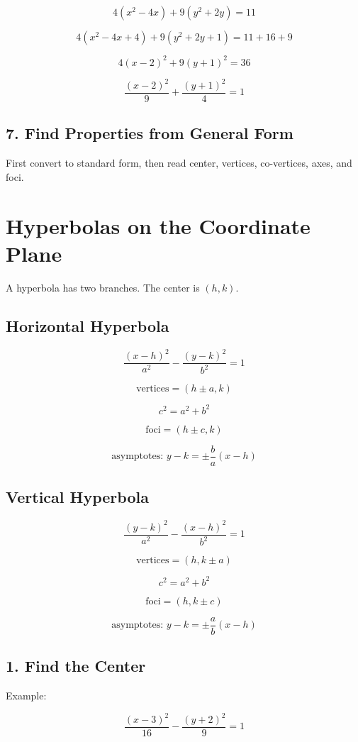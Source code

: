 \documentclass[11pt]{article}
\begin{document}
\[
4(x^2-4x)+9(y^2+2y)=11
\]

\[
4(x^2-4x+4)+9(y^2+2y+1)=11+16+9
\]

\[
4(x-2)^2+9(y+1)^2=36
\]

\[
\frac{(x-2)^2}{9}+\frac{(y+1)^2}{4}=1
\]

\subsection*{7. Find Properties from General Form}

First convert to standard form, then read center, vertices, co-vertices, axes, and foci.

\section*{Hyperbolas on the Coordinate Plane}

A hyperbola has two branches. The center is \((h,k)\).

\subsection*{Horizontal Hyperbola}

\[
\frac{(x-h)^2}{a^2}-\frac{(y-k)^2}{b^2}=1
\]

\[
\text{vertices}=(h\pm a,k)
\]

\[
c^2=a^2+b^2
\]

\[
\text{foci}=(h\pm c,k)
\]

\[
\text{asymptotes: }y-k=\pm\frac{b}{a}(x-h)
\]

\subsection*{Vertical Hyperbola}

\[
\frac{(y-k)^2}{a^2}-\frac{(x-h)^2}{b^2}=1
\]

\[
\text{vertices}=(h,k\pm a)
\]

\[
c^2=a^2+b^2
\]

\[
\text{foci}=(h,k\pm c)
\]

\[
\text{asymptotes: }y-k=\pm\frac{a}{b}(x-h)
\]

\subsection*{1. Find the Center}

Example:

\[
\frac{(x-3)^2}{16}-\frac{(y+2)^2}{9}=1
\]
\end{document}
